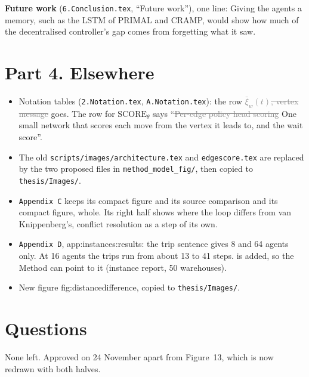 \documentclass[11pt,a4paper]{article}
\newcommand{\new}[1]{\textcolor{newc}{#1}}
\newcommand{\old}[1]{\textcolor{gray}{\sout{#1}}}
\newcommand{\lab}[1]{\textsf{\footnotesize #1}}
\begin{document}
\textbf{Future work} (\texttt{6.Conclusion.tex}, ``Future work''), one
line: \new{Giving the agents a memory, such as the LSTM of PRIMAL and CRAMP,
would show how much of the decentralised controller's gap comes from
forgetting what it saw.}

\section*{Part 4. Elsewhere}
\begin{itemize}[nosep]
  \item Notation tables (\texttt{2.Notation.tex}, \texttt{A.Notation.tex}):
    the row \old{$\bar\xi_w(t)$, vertex message} goes. The row for
    $\mathrm{SCORE}_\theta$ says ``\old{Per-edge policy head scoring}
    \new{One small network that scores} each move from the vertex it leads
    to, and the wait score''.
  \item The old \texttt{scripts/images/architecture.tex} and
    \texttt{edgescore.tex} are replaced by the two proposed files in
    \texttt{method\_model\_fig/}, then copied to \texttt{thesis/Images/}.
  \item \texttt{Appendix C} keeps its compact figure and its source
    comparison and its compact figure, whole. Its right half shows where
    the loop differs from van Knippenberg's, conflict resolution as a step
    of its own.
  \item \texttt{Appendix D}, \lab{app:instances:results}: the trip sentence
    gives 8 and 64 agents only. \new{At 16 agents the trips run from about
    13 to 41 steps.} is added, so the Method can point to it (instance
    report, 50 warehouses).
  \item New figure \lab{fig:distancedifference}, copied to
    \texttt{thesis/Images/}.
\end{itemize}

\section*{Questions}
None left. Approved on 24 November apart from Figure~13, which is now
redrawn with both halves.
\end{document}
